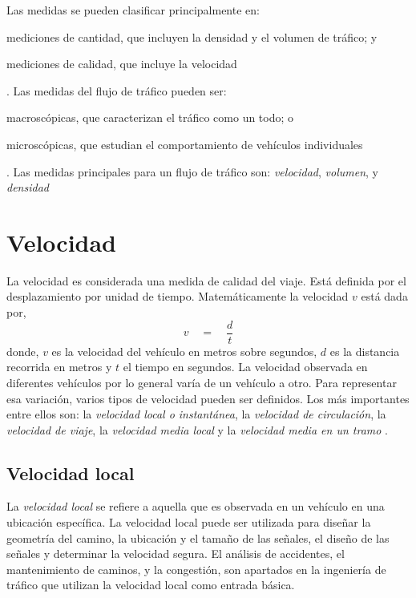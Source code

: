 Las medidas se pueden clasificar principalmente en: \begin{enumerate*}[a)]
\item mediciones de cantidad, que incluyen la densidad y el volumen de tráfico; y \item mediciones de calidad, que incluye la velocidad
\end{enumerate*}. Las medidas del flujo de tráfico pueden ser: \begin{enumerate*}[a)] \item macroscópicas, que caracterizan el tráfico como un todo; o \item microscópicas, que estudian el comportamiento de vehículos individuales \end{enumerate*}. Las medidas principales para un flujo de tráfico son: \emph{velocidad}, \emph{volumen}, y \emph{densidad} \cite{may1990fundamentals}

\section{Velocidad}

La velocidad es considerada una medida de calidad del viaje. Está definida por el desplazamiento por unidad de tiempo. Matemáticamente la velocidad $v$ está dada por,
\begin{equation}
v\quad =\quad \frac { d }{ t }
\end{equation}
donde, $v$ es la velocidad del vehículo en metros sobre segundos, $d$ es la distancia recorrida en metros y $t$ el tiempo en segundos. La velocidad observada en diferentes vehículos por lo general varía de un vehículo a otro. Para representar esa variación, varios tipos de velocidad pueden ser definidos. Los más importantes entre ellos son: la \emph{velocidad local o instantánea}, la \emph{velocidad de circulación}, la \emph{velocidad de viaje}, la \emph{velocidad media local} y la \emph{velocidad media en un tramo} \cite{may1990fundamentals}.

\subsection{Velocidad local}

La \emph{velocidad local} se refiere a aquella que es observada en un vehículo en una ubicación específica. La velocidad local puede ser utilizada para diseñar la geometría del camino, la ubicación y el tamaño de las señales, el diseño de las señales y determinar la velocidad segura. El análisis de accidentes, el mantenimiento de caminos, y la congestión, son apartados en la ingeniería de tráfico que utilizan la velocidad local como entrada básica.

